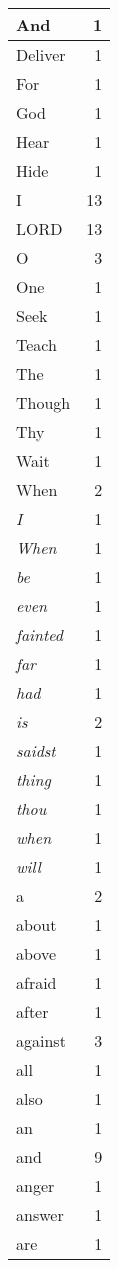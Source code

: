 \begin{center}
\begin{longtable}{l|r}
\hline \hline
\endlastfoot
And & 1 \\ \hline
Deliver & 1 \\ \hline
For & 1 \\ \hline
God & 1 \\ \hline
Hear & 1 \\ \hline
Hide & 1 \\ \hline
I & 13 \\ \hline
LORD & 13 \\ \hline
O & 3 \\ \hline
One & 1 \\ \hline
Seek & 1 \\ \hline
Teach & 1 \\ \hline
The & 1 \\ \hline
Though & 1 \\ \hline
Thy & 1 \\ \hline
Wait & 1 \\ \hline
When & 2 \\ \hline
\emph{I} & 1 \\ \hline
\emph{When} & 1 \\ \hline
\emph{be} & 1 \\ \hline
\emph{even} & 1 \\ \hline
\emph{fainted} & 1 \\ \hline
\emph{far} & 1 \\ \hline
\emph{had} & 1 \\ \hline
\emph{is} & 2 \\ \hline
\emph{saidst} & 1 \\ \hline
\emph{thing} & 1 \\ \hline
\emph{thou} & 1 \\ \hline
\emph{when} & 1 \\ \hline
\emph{will} & 1 \\ \hline
a & 2 \\ \hline
about & 1 \\ \hline
above & 1 \\ \hline
afraid & 1 \\ \hline
after & 1 \\ \hline
against & 3 \\ \hline
all & 1 \\ \hline
also & 1 \\ \hline
an & 1 \\ \hline
and & 9 \\ \hline
anger & 1 \\ \hline
answer & 1 \\ \hline
are & 1 \\ \hline

\end{longtable}
\end{center}
